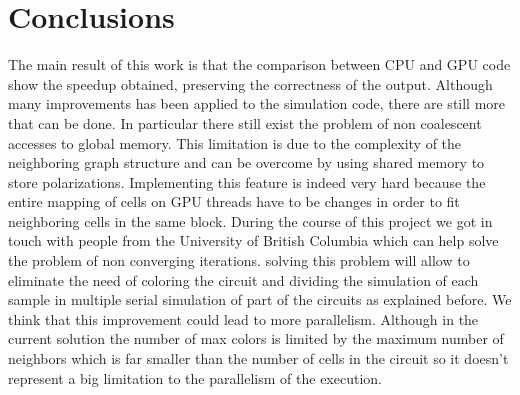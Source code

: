 \chapter{Conclusions}\label{sec:conclusions}
The main result of this work is that the comparison between CPU and GPU code show the speedup obtained, preserving the correctness of the output. Although many improvements has been applied to the simulation code, there are still more that can be done. In particular there still exist the problem of non coalescent accesses to global memory. This limitation is due to the complexity of the neighboring graph structure and can be overcome by using shared memory to store polarizations. Implementing this feature is indeed very hard because the entire mapping of cells on GPU threads have to be changes in order to fit neighboring cells in the same block.\newline
 During the course of this project we got in touch with people from the University of British Columbia which can help solve the problem of non converging iterations. solving this problem will allow to eliminate the need of coloring the circuit and dividing the simulation of each sample in multiple serial simulation of part of the circuits as explained before. We think that this improvement could lead to more parallelism. Although in the current solution the number of max colors is limited by the maximum number of neighbors which is far smaller than the number of cells in the circuit so it doesn't represent a big limitation to the parallelism of the execution.
